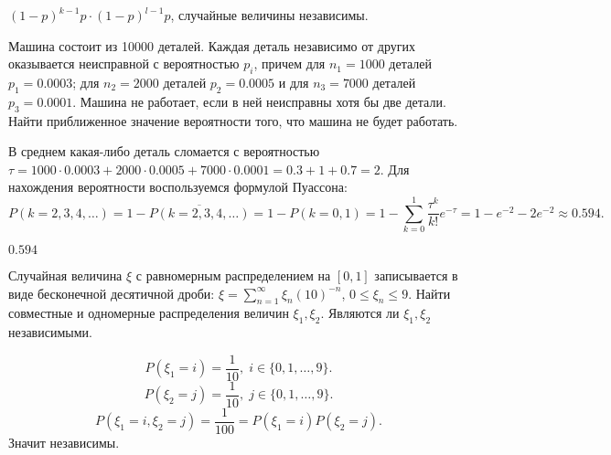 \begin{result}
$ (1 - p)^{k - 1} p \cdot  (1 - p)^{l - 1} p $, случайные величины независимы.
\end{result}

\medskip
\begin{task}{20}
  Машина состоит из 10000 деталей. Каждая деталь независимо от других оказывается неисправной
  с вероятностью $p_i$, причем для $n_1 = 1000$ деталей $p_1 = 0.0003$; для $n_2 = 2000$ деталей 
  $p_2 = 0.0005$ и для $n_3 = 7000$ деталей $p_3 = 0.0001$. Машина не работает, если в ней
  неисправны хотя бы две детали. Найти приближенное значение вероятности того, что машина не будет работать.
\end{task}

\begin{solution}
В среднем какая-либо деталь сломается с вероятностью $\tau = 1000 \cdot 0.0003 + 2000 \cdot 0.0005 +
7000 \cdot  0.0001 = 0.3 + 1 + 0.7 = 2$. Для нахождения вероятности воспользуемся формулой Пуассона:
\[
P(k = 2, 3, 4, \dots) = 1 - \overline{P(k = 2, 3, 4, \dots)} = 1 - P(k = 0, 1) = 1 - 
\sum_{k=0}^{1} \frac{\tau^{k}}{k!} e^{-\tau} = 1 - e^{-2} - 2e^{-2} \approx 0.594 .\] 
\end{solution}

\begin{result}
$0.594$
\end{result}

\medskip
\begin{task}{22}
  Случайная величина $\xi$ с равномерным распределением на $[0, 1]$ записывается в виде бесконечной 
  десятичной дроби: $\xi = \sum_{n=1}^{\infty} \xi_n (10)^{-n}$, $0 \le  \xi_n \le 9$. Найти
  совместные и одномерные распределения величин $\xi_1, \xi_2$. Являются ли $\xi_1, \xi_2$ 
  независимыми.
\end{task}

\begin{solution}
\[
P(\xi_1 = i) = \frac{1}{10},\; i \in \{0, 1, \dots, 9\} 
.\] 
\[
P(\xi_2 = j) = \frac{1}{10},\; j \in \{0, 1, \dots, 9\} 
.\] 
\[
P(\xi_1 = i, \xi_2 = j) = \frac{1}{100} = P(\xi_1 = i) P(\xi_2 = j)
.\] Значит независимы.
\end{solution}

